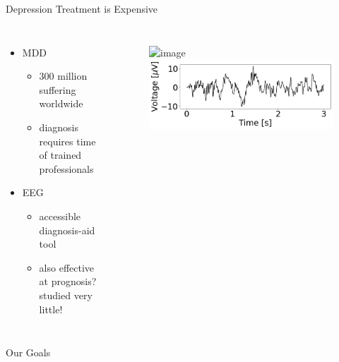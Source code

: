 \documentclass{beamer}
\begin{document}
\begin{frame}{Depression Treatment is Expensive}
	\begin{columns}
        \begin{itemize}
          \item MDD
            \begin{itemize}
              \item<2-> 300 million suffering worldwide %
              \item<3-> diagnosis requires time of trained professionals %
            \end{itemize}
          \item EEG 
            \begin{itemize}
              \item<4-> accessible diagnosis-aid tool %
              \item<5-> also effective at prognosis? {\scriptsize studied very little!} 
            \end{itemize}
        \end{itemize}
        \vfill
            \begin{figure}
                \includegraphics<1->[width=0.9\linewidth]{./Images/electrodes.png}
                \\
                \includegraphics[width=\linewidth]{./Images/signal.png}
            \end{figure}
	\end{columns}
\end{frame}


\begin{frame}{Our Goals}
  
\end{frame}
\end{document}
